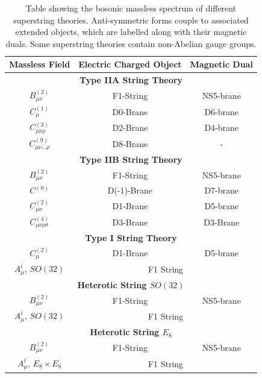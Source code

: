 \documentclass[11pt,a4paper]{article}
\numberwithin{equation}{section}
\numberwithin{table}{section}\setlength{\multlinegap}{25pt}
\begin{document}
\begin{table}[h]
\centering
\begin{tabular}{|c|c|c|}
\hline
Massless Field &  Electric Charged Object & Magnetic Dual \\
\hline
\multicolumn{3}{|c|}{{\bf Type IIA String Theory}} \\
\hline
$B^{(2)}_{\mu\nu}$ & F1-String & NS5-brane\\
\hline
$C^{(1)}_{\mu}$ & D0-Brane & D6-brane\\
\hline
$C^{(3)}_{\mu\nu\rho}$ & D2-Brane & D4-brane\\
\hline
$C^{(9)}_{\mu\nu...\rho}$ & D8-Brane & - \\
\hline
\multicolumn{3}{|c|}{{\bf Type IIB String Theory}} \\
\hline
$B^{(2)}_{\mu\nu}$ & F1-String & NS5-brane\\
\hline
$C^{(0)}$ & D(-1)-Brane & D7-brane\\
\hline
$C^{(2)}_{\mu\nu}$ & D1-Brane & D5-brane\\
\hline
$C^{(4)}_{\mu\nu\rho\sigma}$ & D3-Brane & D3-Brane \\
\hline
\multicolumn{3}{|c|}{{\bf Type I String Theory}} \\
\hline
$C^{(2)}_{\mu}$ & D1-Brane & D5-brane\\
\hline
$A^i_{\mu}$, $SO(32)$ & \multicolumn{2}{|c|}{F1 String}   \\
\hline
\multicolumn{3}{|c|}{{\bf Heterotic String $SO(32)$}} \\
\hline
$B^{(2)}_{\mu\nu}$ & F1-String & NS5-brane\\
\hline
$A^i_{\mu}$, $SO(32)$ & \multicolumn{2}{|c|}{F1 String}   \\
\hline
\multicolumn{3}{|c|}{{\bf Heterotic String $E_8$}} \\
\hline
$B^{(2)}_{\mu\nu}$ & F1-String & NS5-brane\\
\hline
$A^i_{\mu}$, $E_8 \times E_8$ & \multicolumn{2}{|c|}{F1 String}   \\
\hline
\end{tabular}
\caption{Table showing the bosonic massless spectrum of different superstring theories. Anti-symmetric forms couple to associated extended objects, which are labelled along with their magnetic duals. Some superstring theories contain non-Abelian gauge groups.} 
\label{tab:stringthe}
\end{table}
\end{document}

